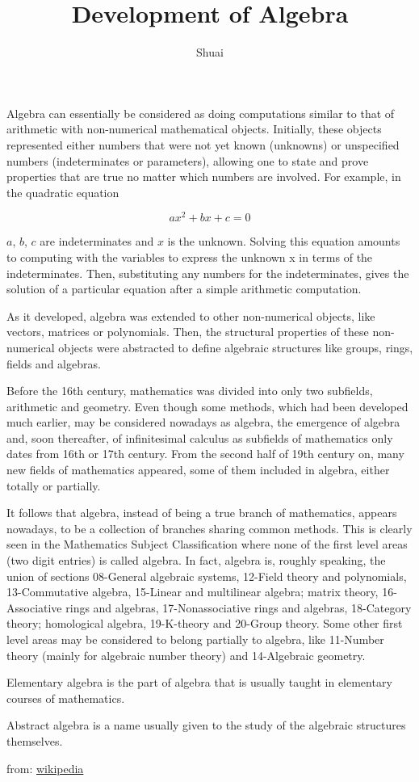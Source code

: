 \documentclass[a4paper]{article}
\title{Development of Algebra}
\author{Shuai}
\date{}
\begin{document}
\maketitle

Algebra can essentially be considered as doing computations similar to
that of arithmetic with non-numerical mathematical objects.
Initially, these objects represented either numbers that were not yet
known (unknowns) or unspecified numbers (indeterminates or parameters),
allowing one to state and prove properties that are true no matter which
numbers are involved. For example, in the quadratic equation

\begin{displaymath}
	ax^2+bx+c=0
\end{displaymath}

$a$, $b$, $c$ are indeterminates and $x$ is the unknown. Solving this equation
amounts to computing with the variables to express the unknown x in
terms of the indeterminates. Then, substituting any numbers for the
indeterminates, gives the solution of a particular equation after a
simple arithmetic computation.

As it developed, algebra was extended to other non-numerical objects,
like vectors, matrices or polynomials. Then, the structural properties
of these non-numerical objects were abstracted to define algebraic
structures like groups, rings, fields and algebras.

Before the 16th century, mathematics was divided into only two
subfields, arithmetic and geometry. Even though some methods, which had
been developed much earlier, may be considered nowadays as algebra, the
emergence of algebra and, soon thereafter, of infinitesimal calculus as
subfields of mathematics only dates from 16th or 17th century. From the
second half of 19th century on, many new fields of mathematics appeared,
some of them included in algebra, either totally or partially.

It follows that algebra, instead of being a true branch of mathematics,
appears nowadays, to be a collection of branches sharing common methods.
This is clearly seen in the Mathematics Subject Classification where
none of the first level areas (two digit entries) is called algebra. In
fact, algebra is, roughly speaking, the union of sections 08-General
algebraic systems, 12-Field theory and polynomials, 13-Commutative
algebra, 15-Linear and multilinear algebra; matrix theory,
16-Associative rings and algebras, 17-Nonassociative rings and algebras,
18-Category theory; homological algebra, 19-K-theory and 20-Group
theory. Some other first level areas may be considered to belong
partially to algebra, like 11-Number theory (mainly for algebraic number
theory) and 14-Algebraic geometry.

Elementary algebra is the part of algebra that is usually taught in
elementary courses of mathematics.

Abstract algebra is a name usually given to the study of the algebraic
structures themselves.

from: \href{http://en.wikipedia.org/wiki/Algebra}{wikipedia}
\end{document}

